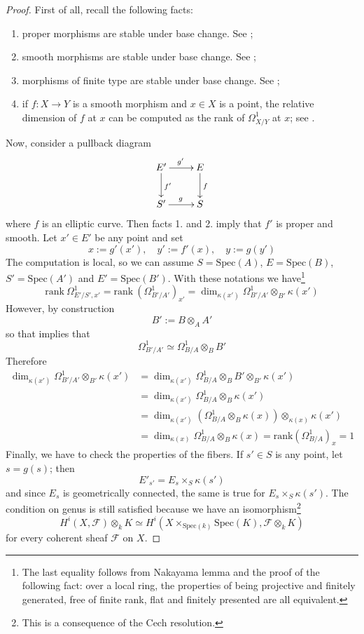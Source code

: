 \begin{refsection}
\begin{proof}
First of all, recall the following facts:
\begin{enumerate}
\item proper morphisms are stable under base change. See \cite[Prop. 3.3.16.(c)]{liu};
\item smooth morphisms are stable under base change. See \cite[Prop 4.3.38]{liu};
\item morphisms of finite type are stable under base change. See \cite[Prop 3.2.4.(c)]{liu};
\item if $f \colon X \to Y$ is a smooth morphism and $x \in X$ is a point, the relative dimension of $f$ at $x$ can be computed as the rank of $\Omega^1_{X/Y}$ at $x$; see \cite[Def. 6.4.10]{liu}.
\end{enumerate}
Now, consider a pullback diagram
\[
\xymatrix{
E' \ar[d]^{f'} \ar[r]^{g'} & E \ar[d]^f \\ S' \ar[r]^g & S
}
\]
where $f$ is an elliptic curve. Then facts 1. and 2. imply that $f'$ is proper and smooth. Let $x' \in E'$ be any point and set
\[
x := g'(x'), \quad y' := f'(x), \quad y := g(y')
\]
The computation is local, so we can assume $S = \mathrm{Spec}(A)$, $E = \mathrm{Spec}(B)$, $S' = \mathrm{Spec}(A')$ and $E' = \mathrm{Spec}(B')$. With these notations we have\footnote{The last equality follows from Nakayama lemma and the proof of the following fact: over a local ring, the properties of being projective and finitely generated, free of finite rank, flat and finitely presented are all equivalent.}
\[
\mathrm{rank} \: \Omega^1_{E'/S',x'} = \mathrm{rank} \: \left( \Omega^1_{B'/A'} \right)_{x'} = \dim_{\kappa(x')} \Omega^1_{B'/A'} \otimes_{B'} \kappa(x')
\]
However, by construction
\[
B' := B \otimes_A A'
\]
so that \cite[Prop 6.1.8.(a)]{liu} implies that
\[
\Omega^1_{B'/A'} \simeq \Omega^1_{B/A} \otimes_B B'
\]
Therefore
\begin{align*}
\dim_{\kappa(x')} \Omega^1_{B'/A'} \otimes_{B'} \kappa(x') & = \dim_{\kappa(x')} \Omega^1_{B/A} \otimes_B B' \otimes_{B'} \kappa(x') \\
& = \dim_{\kappa(x')} \Omega^1_{B/A} \otimes_B \kappa(x') \\
& = \dim_{\kappa(x')} \left( \Omega^1_{B/A} \otimes_B \kappa(x) \right) \otimes_{\kappa(x)} \kappa(x') \\
& = \dim_{\kappa(x)} \Omega^1_{B/A} \otimes_B \kappa(x) = \mathrm{rank} \left( \Omega^1_{B/A} \right)_x = 1
\end{align*}
Finally, we have to check the properties of the fibers. If $s' \in S$ is any point, let $s = g(s)$; then
\[
E'_{s'} = E_s \times_S \kappa(s')
\]
and since $E_s$ is geometrically connected, the same is true for $E_s \times_S \kappa(s')$. The condition on genus is still satisfied because we have an isomorphism\footnote{This is a consequence of the Cech resolution.}
\[
H^i(X,\mathcal F) \otimes_k K \simeq H^i(X \times_{\mathrm{Spec}(k)} \mathrm{Spec}(K), \mathcal F \otimes_k K)
\]
for every coherent sheaf $\mathcal F$ on $X$.
\end{proof}


\end{refsection}
